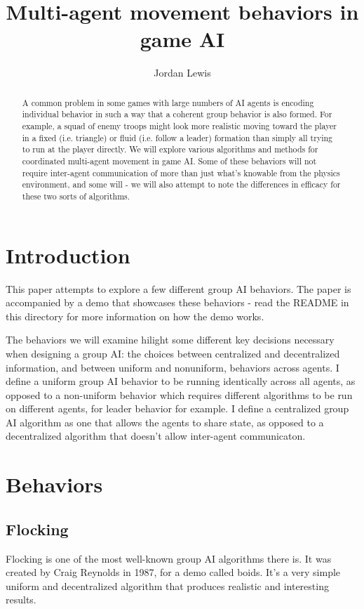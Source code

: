 \documentclass{article}
\begin{document}
\title{Multi-agent movement behaviors in game AI}
\author{Jordan Lewis}
\maketitle

\begin{abstract}
A common problem in some games with large numbers of AI agents is encoding
individual behavior in such a way that a coherent group behavior is also
formed. For example, a squad of enemy troops might look more realistic moving
toward the player in a fixed (i.e. triangle) or fluid (i.e. follow a leader)
formation than simply all trying to run at the player directly. We will explore
various algorithms and methods for coordinated multi-agent movement in game
AI. Some of these behaviors will not require inter-agent communication of more
than just what's knowable from the physics environment, and some will - we will
also attempt to note the differences in efficacy for these two sorts of
algorithms.
\end{abstract}

\section {Introduction}
This paper attempts to explore a few different group AI behaviors. The paper
is accompanied by a demo that showcases these behaviors - read the README
in this directory for more information on how the demo works.

The behaviors we will examine hilight some different key decisions necessary
when designing a group AI: the choices between centralized and decentralized
information, and between uniform and nonuniform, behaviors across agents. I
define a uniform group AI behavior to be running identically across all agents,
as opposed to a non-uniform behavior which requires different algorithms to be
run on different agents, for leader behavior for example. I define a centralized
group AI algorithm as one that allows the agents to share state, as opposed to
a decentralized algorithm that doesn't allow inter-agent communicaton.
\section {Behaviors}
\subsection {Flocking}
Flocking is one of the most well-known group AI algorithms there is. It was
created by Craig Reynolds in 1987, for a demo called boids. It's a very simple
uniform and decentralized algorithm that produces realistic and interesting
results.
\end{document}
